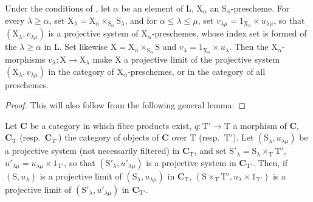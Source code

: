 \begin{proposition}[8.2.5]
\label{IV.8.2.5}
Under the conditions of , let $\alpha$ be an element of $\mathrm{L}$, $\mathrm{X}_\alpha$ an $\mathrm{S}_\alpha$-prescheme.
For every $\lambda\geqslant\alpha$, set $\mathrm{X}_\lambda=\mathrm{X}_\alpha\times_{\mathrm{S}_\alpha}\mathrm{S}_\lambda$, and for $\alpha\leqslant\lambda\leqslant\mu$, set $v_{\lambda\mu}=1_{\mathrm{X}_\alpha}\times u_{\lambda\mu}$, so that $(\mathrm{X}_\lambda,v_{\lambda\mu})$ is a projective system of $\mathrm{X}_\alpha$-preschemes, whose index set is formed of the $\lambda\geqslant\alpha$ in $\mathrm{L}$.
Set likewise $\mathrm{X}=\mathrm{X}_\alpha\times_{\mathrm{S}_\alpha}\mathrm{S}$ and $v_\lambda=1_{\mathrm{X}_\alpha}\times u_\lambda$.
Then the $\mathrm{X}_\alpha$-morphisms $v_\lambda:\mathrm{X}\to\mathrm{X}_\lambda$ make $\mathrm{X}$ a projective limit of the projective system $(\mathrm{X}_\lambda,v_{\lambda\mu})$ in the category of $\mathrm{X}_\alpha$-preschemes, or in the category of all preschemes.
\end{proposition}

\begin{proof}
This will also follow from the following general lemma:
\end{proof}

\begin{lemma}[8.2.6]
\label{IV.8.2.6}
Let $\mathbf{C}$ be a category in which fibre products exist, $q:\mathrm{T}'\to\mathrm{T}$ a morphism of $\mathbf{C}$, $\mathbf{C}_\mathrm{T}$ (resp.\ $\mathbf{C}_{\mathrm{T}'}$) the category of objects of $\mathbf{C}$ over
$\mathrm{T}$ (resp.\ $\mathrm{T}'$).
Let $(\mathrm{S}_\lambda,u_{\lambda\mu})$ be a projective system (not necessarily filtered) in $\mathbf{C}_\mathrm{T}$, and set $\mathrm{S}'_\lambda=\mathrm{S}_\lambda\times_\mathrm{T}\mathrm{T}'$, $u'_{\lambda\mu}=u_{\lambda\mu}\times 1_{\mathrm{T}'}$, so that $(\mathrm{S}'_\lambda,u'_{\lambda\mu})$ is a projective system in $\mathbf{C}_{\mathrm{T}'}$.
Then, if $(\mathrm{S},u_\lambda)$ is a projective limit of $(\mathrm{S}_\lambda,u_{\lambda\mu})$ in $\mathbf{C}_\mathrm{T}$, $(\mathrm{S}\times_\mathrm{T}\mathrm{T}',u_\lambda\times 1_{\mathrm{T}'})$ is a projective limit of $(\mathrm{S}'_\lambda,u'_{\lambda\mu})$ in $\mathbf{C}_{\mathrm{T}'}$.
\end{lemma}

